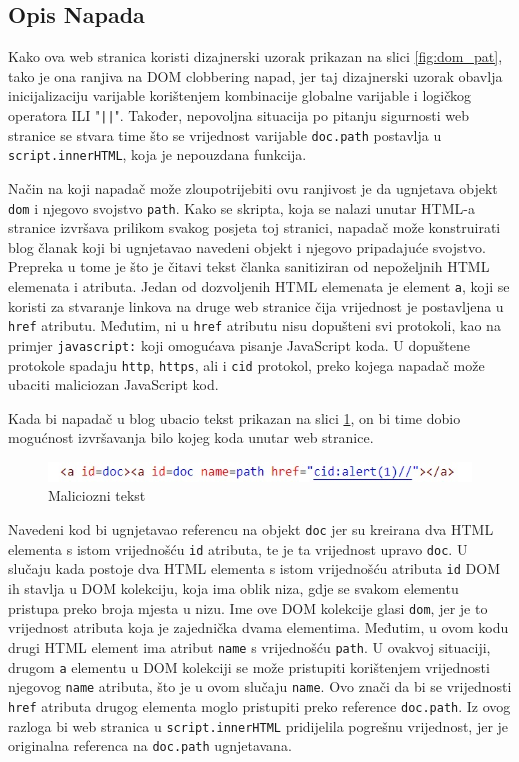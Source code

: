\documentclass[12pt, oneside, onecolumn]{book}
\begin{document}
{\subsection{Opis Napada}
Kako ova web stranica koristi dizajnerski uzorak prikazan na slici \ref{fig:dom_pat}, tako je ona ranjiva na DOM clobbering napad, jer taj dizajnerski uzorak obavlja inicijalizaciju varijable korištenjem kombinacije globalne varijable i logičkog operatora ILI "\texttt{||}". Također, nepovoljna situacija po pitanju sigurnosti web stranice se stvara time što se vrijednost varijable \texttt{doc.path} postavlja u \texttt{script.innerHTML}, koja je nepouzdana funkcija.

Način na koji napadač može zloupotrijebiti ovu ranjivost je da ugnjetava objekt \texttt{dom} i njegovo svojstvo \texttt{path}. Kako se skripta, koja se nalazi unutar HTML-a stranice izvršava prilikom svakog posjeta toj stranici, napadač može konstruirati blog članak koji bi ugnjetavao navedeni objekt i njegovo pripadajuće svojstvo. Prepreka u tome je što je čitavi tekst članka sanitiziran od nepoželjnih HTML elemenata i atributa. Jedan od dozvoljenih HTML elemenata je element \texttt{a}, koji se koristi za stvaranje linkova na druge web stranice čija vrijednost je postavljena u \texttt{href} atributu. Međutim, ni u \texttt{href} atributu nisu dopušteni svi protokoli, kao na primjer \texttt{javascript:} koji omogućava pisanje JavaScript koda. U dopuštene protokole spadaju \texttt{http}, \texttt{https}, ali i \texttt{cid} protokol, preko kojega napadač može ubaciti maliciozan JavaScript kod.

Kada bi napadač u blog ubacio tekst prikazan na slici \ref{fig:dom_pay}, on bi time dobio mogućnost izvršavanja bilo kojeg koda unutar web stranice.

\begin{figure}[H]
	\begin{center}
		\includegraphics[width=\textwidth]{dom_pay.jpg}
		\caption{Maliciozni tekst} \label{fig:dom_pay}
	\end{center}
\end{figure}

Navedeni kod bi ugnjetavao referencu na objekt \texttt{doc} jer su kreirana dva HTML elementa s istom vrijednošću \texttt{id} atributa, te je ta vrijednost upravo \texttt{doc}. U slučaju kada postoje dva HTML elementa s istom vrijednošću atributa \texttt{id} DOM ih stavlja u DOM kolekciju, koja ima oblik niza, gdje se svakom elementu pristupa preko broja mjesta u nizu. Ime ove DOM kolekcije glasi \texttt{dom}, jer je to vrijednost atributa koja je zajednička dvama elementima. Međutim, u ovom kodu drugi HTML element ima atribut \texttt{name} s vrijednošću \texttt{path}. U ovakvoj situaciji, drugom \texttt{a} elementu u DOM kolekciji se može pristupiti  korištenjem vrijednosti njegovog \texttt{name} atributa, što je u ovom slučaju \texttt{name}. Ovo znači da bi se vrijednosti \texttt{href} atributa drugog elementa moglo pristupiti preko reference \texttt{doc.path}. Iz ovog razloga bi web stranica u \texttt{script.innerHTML} pridijelila pogrešnu vrijednost, jer je originalna referenca na \texttt{doc.path} ugnjetavana.

}
\end{document}
